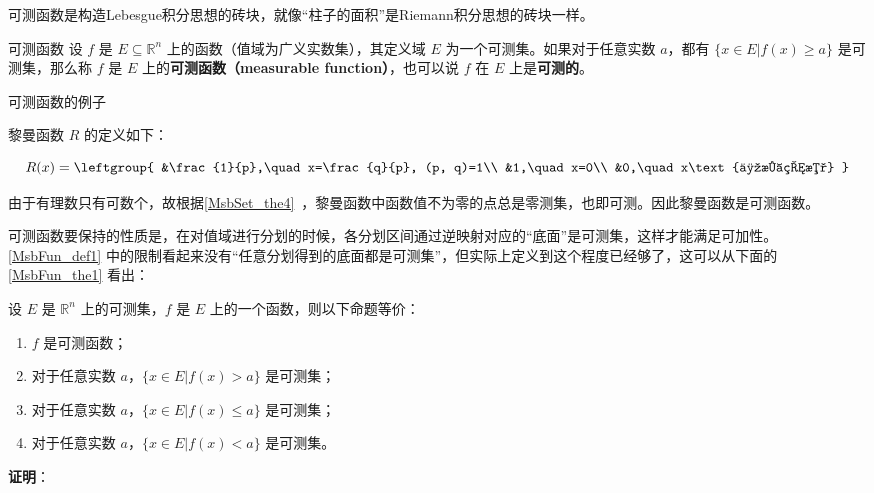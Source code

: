 可测函数是构造Lebesgue积分思想的砖块，就像“柱子的面积”是Riemann积分思想的砖块一样。

\begin{definition}{可测函数}\label{MsbFun_def1}
设 $f$ 是 $E\subseteq\mathbb{R}^n$ 上的函数（值域为广义实数集），其定义域 $E$ 为一个可测集。如果对于任意实数 $a$，都有 $\{x\in E|f(x)\geq a\}$ 是可测集，那么称 $f$ 是 $E$ 上的\textbf{可测函数（measurable function）}，也可以说 $f$ 在 $E$ 上是\textbf{可测的}。
\end{definition}

\begin{example}{可测函数的例子}

黎曼函数 $R$ 的定义如下：

\begin{equation}
R(x)=
\leftgroup{
        &\frac{1}{p},\quad x=\frac{q}{p}, (p, q)=1\\
        &1,\quad x=0\\
        &0,\quad x\text{为无理数}
}
\end{equation}

由于有理数只有可数个，故根据\autoref{MsbSet_the4}~，黎曼函数中函数值不为零的点总是零测集，也即可测。因此黎曼函数是可测函数。

\end{example}









可测函数要保持的性质是，在对值域进行分划的时候，各分划区间通过逆映射对应的“底面”是可测集，这样才能满足可加性。\autoref{MsbFun_def1} 中的限制看起来没有“任意分划得到的底面都是可测集”，但实际上定义到这个程度已经够了，这可以从下面的\autoref{MsbFun_the1} 看出：


\begin{theorem}{}\label{MsbFun_the1}
设 $E$ 是 $\mathbb{R}^n$ 上的可测集，$f$ 是 $E$ 上的一个函数，则以下命题等价：
\begin{enumerate}
\item $f$ 是可测函数；
\item 对于任意实数 $a$，$\{x\in E|f(x)>a\}$ 是可测集；
\item 对于任意实数 $a$，$\{x\in E|f(x)\leq a\}$ 是可测集；
\item 对于任意实数 $a$，$\{x\in E|f(x)<a\}$ 是可测集。
\end{enumerate}
\end{theorem}

\textbf{证明}：

